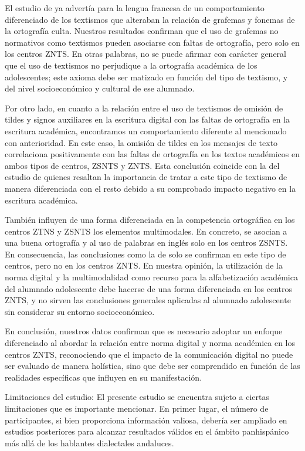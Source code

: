 \documentclass[spanish]{textolivre}
\begin{document}
El estudio de \textcite{bernicot2014skilled} ya advertía para la lengua francesa de un comportamiento diferenciado de los textismos que alteraban la relación de grafemas y fonemas de la ortografía culta. Nuestros resultados confirman que el uso de grafemas no normativos como textismos pueden asociarse con faltas de ortografía, pero solo en los centros ZNTS. En otras palabras, no se puede afirmar con carácter general que el uso de textismos no perjudique a la ortografía académica de los adolescentes; este axioma debe ser matizado en función del tipo de textismo, y del nivel socioeconómico y cultural de ese alumnado.

Por otro lado, en cuanto a la relación entre el uso de textismos de omisión de tildes y signos auxiliares en la escritura digital con las faltas de ortografía en la escritura académica, encontramos un comportamiento diferente al mencionado con anterioridad. En este caso, la omisión de tildes en los mensajes de texto correlaciona positivamente con las faltas de ortografía en los textos académicos en ambos tipos de centros, ZSNTS y ZNTS. Esta conclusión coincide con la del estudio de \textcite{gomez-camacho_youth_2023b} quienes resaltan la importancia de tratar a este tipo de textismo de manera diferenciada con el resto debido a su comprobado impacto negativo en la escritura académica.

También influyen de una forma diferenciada en la competencia ortográfica en los centros ZTNS y ZSNTS los elementos multimodales. En concreto, se asocian a una buena ortografía y al uso de palabras en inglés solo en los centros ZSNTS. En consecuencia, las conclusiones como la de \textcite{gomez-camacho_textisms_2018} solo se confirman en este tipo de centros, pero no en los centros ZNTS. En nuestra opinión, la utilización de la norma digital y la multimodalidad como recurso para la alfabetización académica del alumnado adolescente debe hacerse de una forma diferenciada en los centros ZNTS, y no sirven las conclusiones generales aplicadas al alumnado adolescente sin considerar su entorno socioeconómico. 

En conclusión, nuestros datos confirman que es necesario adoptar un enfoque diferenciado al abordar la relación entre norma digital y norma académica en los centros ZNTS, reconociendo que el impacto de la comunicación digital no puede ser evaluado de manera holística, sino que debe ser comprendido en función de las realidades específicas que influyen en su manifestación.

Limitaciones del estudio:
El presente estudio se encuentra sujeto a ciertas limitaciones que es importante mencionar. En primer lugar, el número de participantes, si bien proporciona información valiosa, debería ser ampliado en estudios posteriores para alcanzar resultados válidos en el ámbito panhispánico más allá de los hablantes dialectales andaluces. 
\end{document}
